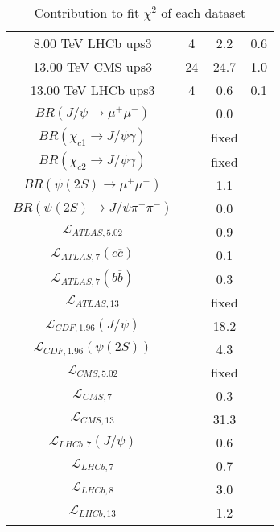 \begin{table}[h!]
\begin{tabular}{c|c|c|c}
8.00 TeV LHCb ups3 & 4 & 2.2 & 0.6 \\
13.00 TeV CMS ups3 & 24 & 24.7 & 1.0 \\
13.00 TeV LHCb ups3 & 4 & 0.6 & 0.1 \\
\hline
$BR(J/\psi\rightarrow\mu^+\mu^-)$ &  & 0.0 &  \\
$BR(\chi_{c1}\rightarrow J/\psi\gamma)$ &  & fixed & \\
$BR(\chi_{c2}\rightarrow J/\psi\gamma)$ &  & fixed & \\
$BR(\psi(2S)\rightarrow\mu^+\mu^-)$ &  & 1.1 &  \\
$BR(\psi(2S)\rightarrow J/\psi\pi^+\pi^-)$ &  & 0.0 &  \\
$\mathcal L_{ATLAS,5.02}$ &  & 0.9 &  \\
$\mathcal L_{ATLAS,7}(c\overline c)$ &  & 0.1 &  \\
$\mathcal L_{ATLAS,7}(b\overline b)$ &  & 0.3 &  \\
$\mathcal L_{ATLAS,13}$ &  & fixed & \\
$\mathcal L_{CDF,1.96}(J/\psi)$ &  & 18.2 &  \\
$\mathcal L_{CDF,1.96}(\psi(2S))$ &  & 4.3 &  \\
$\mathcal L_{CMS,5.02}$ &  & fixed & \\
$\mathcal L_{CMS,7}$ &  & 0.3 &  \\
$\mathcal L_{CMS,13}$ &  & 31.3 &  \\
$\mathcal L_{LHCb,7}(J/\psi)$ &  & 0.6 &  \\
$\mathcal L_{LHCb,7}$ &  & 0.7 &  \\
$\mathcal L_{LHCb,8}$ &  & 3.0 &  \\
$\mathcal L_{LHCb,13}$ &  & 1.2 &  \\
\end{tabular}
\caption{Contribution to fit $\chi^2$ of each dataset}
\end{table}
